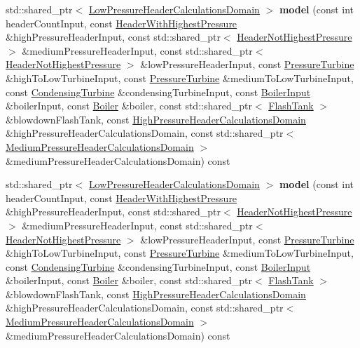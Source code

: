 \begin{DoxyCompactItemize}
std\+::shared\+\_\+ptr$<$ \hyperlink{class_low_pressure_header_calculations_domain}{Low\+Pressure\+Header\+Calculations\+Domain} $>$ {\bfseries model} (const int header\+Count\+Input, const \hyperlink{class_header_with_highest_pressure}{Header\+With\+Highest\+Pressure} \&high\+Pressure\+Header\+Input, const std\+::shared\+\_\+ptr$<$ \hyperlink{class_header_not_highest_pressure}{Header\+Not\+Highest\+Pressure} $>$ \&medium\+Pressure\+Header\+Input, const std\+::shared\+\_\+ptr$<$ \hyperlink{class_header_not_highest_pressure}{Header\+Not\+Highest\+Pressure} $>$ \&low\+Pressure\+Header\+Input, const \hyperlink{class_pressure_turbine}{Pressure\+Turbine} \&high\+To\+Low\+Turbine\+Input, const \hyperlink{class_pressure_turbine}{Pressure\+Turbine} \&medium\+To\+Low\+Turbine\+Input, const \hyperlink{class_condensing_turbine}{Condensing\+Turbine} \&condensing\+Turbine\+Input, const \hyperlink{class_boiler_input}{Boiler\+Input} \&boiler\+Input, const \hyperlink{class_boiler}{Boiler} \&boiler, const std\+::shared\+\_\+ptr$<$ \hyperlink{class_flash_tank}{Flash\+Tank} $>$ \&blowdown\+Flash\+Tank, const \hyperlink{class_high_pressure_header_calculations_domain}{High\+Pressure\+Header\+Calculations\+Domain} \&high\+Pressure\+Header\+Calculations\+Domain, const std\+::shared\+\_\+ptr$<$ \hyperlink{class_medium_pressure_header_calculations_domain}{Medium\+Pressure\+Header\+Calculations\+Domain} $>$ \&medium\+Pressure\+Header\+Calculations\+Domain) const
\item 
\mbox{\label{class_low_pressure_header_modeler_ab3f2f01bdacfb2527df2f085264372d7}} 
std\+::shared\+\_\+ptr$<$ \hyperlink{class_low_pressure_header_calculations_domain}{Low\+Pressure\+Header\+Calculations\+Domain} $>$ {\bfseries model} (const int header\+Count\+Input, const \hyperlink{class_header_with_highest_pressure}{Header\+With\+Highest\+Pressure} \&high\+Pressure\+Header\+Input, const std\+::shared\+\_\+ptr$<$ \hyperlink{class_header_not_highest_pressure}{Header\+Not\+Highest\+Pressure} $>$ \&medium\+Pressure\+Header\+Input, const std\+::shared\+\_\+ptr$<$ \hyperlink{class_header_not_highest_pressure}{Header\+Not\+Highest\+Pressure} $>$ \&low\+Pressure\+Header\+Input, const \hyperlink{class_pressure_turbine}{Pressure\+Turbine} \&high\+To\+Low\+Turbine\+Input, const \hyperlink{class_pressure_turbine}{Pressure\+Turbine} \&medium\+To\+Low\+Turbine\+Input, const \hyperlink{class_condensing_turbine}{Condensing\+Turbine} \&condensing\+Turbine\+Input, const \hyperlink{class_boiler_input}{Boiler\+Input} \&boiler\+Input, const \hyperlink{class_boiler}{Boiler} \&boiler, const std\+::shared\+\_\+ptr$<$ \hyperlink{class_flash_tank}{Flash\+Tank} $>$ \&blowdown\+Flash\+Tank, const \hyperlink{class_high_pressure_header_calculations_domain}{High\+Pressure\+Header\+Calculations\+Domain} \&high\+Pressure\+Header\+Calculations\+Domain, const std\+::shared\+\_\+ptr$<$ \hyperlink{class_medium_pressure_header_calculations_domain}{Medium\+Pressure\+Header\+Calculations\+Domain} $>$ \&medium\+Pressure\+Header\+Calculations\+Domain) const
\end{DoxyCompactItemize}


